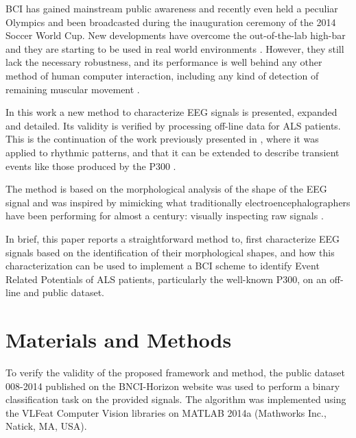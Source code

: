 \documentclass[entropy,article,submit,moreauthors,pdftex,10pt,a4paper]{mdpi}
\begin{document}
BCI has gained mainstream public awareness and recently even held a peculiar Olympics \citep{Riener2014} and been broadcasted during the inauguration ceremony of the 2014 Soccer World Cup.  New developments have overcome the out-of-the-lab high-bar and they are starting to be used in real world environments \citep{Huggins2016}.  However, they still lack the necessary robustness, and its performance is well behind any other method of human computer interaction, including any kind of detection of remaining muscular movement \citep{Clerc}.

In this work a new method to characterize EEG signals is presented, expanded and detailed.  Its validity is verified by processing off-line data for ALS patients.  This is the continuation of the work previously presented in \citep{Ramele2016}, where it was applied to rhythmic patterns, and that it can be extended to describe transient events like those produced by the P300 \citep{Knuth2006}.

The method is based on the morphological analysis of the shape of the EEG signal \citep{Alvarado-Gonzalez2016,Yamaguchi2009} and was inspired by mimicking what traditionally electroencephalographers have been performing for almost a century: visually inspecting  raw signals \citep{Hartman2005}.


In brief, this paper reports a straightforward method to, first characterize EEG signals based on the identification of their morphological shapes, and how this characterization can be used to implement a BCI scheme to identify Event Related Potentials of ALS patients, particularly the well-known P300, on an off-line and public dataset.


\section{Materials and Methods}

To verify the validity of the proposed framework and method, the public dataset 008-2014  \citep{Riccio2013} published on the BNCI-Horizon website \citep{Brunner2014} was used to perform a binary classification task on the provided signals.  The algorithm was implemented using the VLFeat  \citep{Vedaldi2010} Computer Vision libraries on MATLAB 2014a (Mathworks Inc., Natick, MA, USA). 
\end{document}
